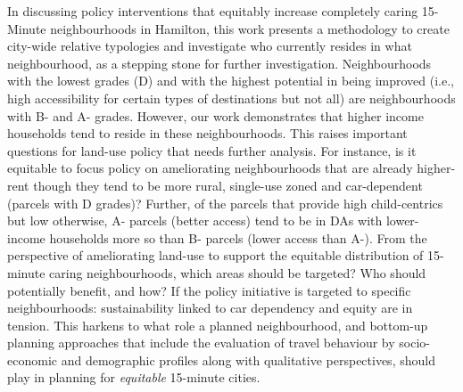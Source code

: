 \documentclass[
  authoryear,
  preprint,
  3p]{elsarticle}
\begin{document}
In discussing policy interventions that equitably increase completely
caring 15-Minute neighbourhoods in Hamilton, this work presents a
methodology to create city-wide relative typologies and investigate who
currently resides in what neighbourhood, as a stepping stone for further
investigation. Neighbourhoods with the lowest grades (D) and with the
highest potential in being improved (i.e., high accessibility for
certain types of destinations but not all) are neighbourhoods with B-
and A- grades. However, our work demonstrates that higher income
households tend to reside in these neighbourhoods. This raises important
questions for land-use policy that needs further analysis. For instance,
is it equitable to focus policy on ameliorating neighbourhoods that are
already higher-rent though they tend to be more rural, single-use zoned
and car-dependent (parcels with D grades)? Further, of the parcels that
provide high child-centrics but low otherwise, A- parcels (better
access) tend to be in DAs with lower-income households more so than B-
parcels (lower access than A-). From the perspective of ameliorating
land-use to support the equitable distribution of 15-minute caring
neighbourhoods, which areas should be targeted? Who should potentially
benefit, and how? If the policy initiative is targeted to specific
neighbourhoods: sustainability linked to car dependency and equity are
in tension. This harkens to what role a planned neighbourhood, and
bottom-up planning approaches that include the evaluation of travel
behaviour by socio-economic and demographic profiles along with
qualitative perspectives, should play in planning for \emph{equitable}
15-minute cities.
\end{document}
